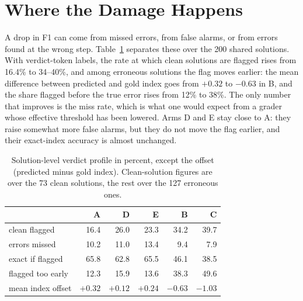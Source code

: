 \documentclass[11pt]{article}
\newcommand{\arm}[1]{\textsc{#1}}
\begin{document}
\section{Where the Damage Happens}
\label{sec:analysis}

A drop in F1 can come from missed errors, from false alarms, or from errors found at the wrong
step. Table~\ref{tab:profile} separates these over the 200 shared solutions. With verdict-token
labels, the rate at which clean solutions are flagged rises from 16.4\% to 34--40\%, and among
erroneous solutions the flag moves earlier: the mean difference between predicted and gold index
goes from $+0.32$ to $-0.63$ in \arm{B}, and the share flagged before the true error rises from
12\% to 38\%. The only number that improves is the miss rate, which is what one would expect
from a grader whose effective threshold has been lowered. Arms \arm{D} and \arm{E} stay close to
\arm{A}: they raise somewhat more false alarms, but they do not move the flag earlier, and their
exact-index accuracy is almost unchanged.

\begin{table}[t]
\centering
\small
\setlength{\tabcolsep}{2.6pt}
\begin{tabular}{lrrrrr}
\toprule
 & \arm{A} & \arm{D} & \arm{E} & \arm{B} & \arm{C} \\
\midrule
clean flagged & 16.4 & 26.0 & 23.3 & 34.2 & 39.7 \\
errors missed & 10.2 & 11.0 & 13.4 & 9.4 & 7.9 \\
exact if flagged & 65.8 & 62.8 & 65.5 & 46.1 & 38.5 \\
flagged too early & 12.3 & 15.9 & 13.6 & 38.3 & 49.6 \\
mean index offset & $+0.32$ & $+0.12$ & $+0.24$ & $-0.63$ & $-1.03$ \\
\bottomrule
\end{tabular}
\caption{Solution-level verdict profile in percent, except the offset (predicted minus gold
index). Clean-solution figures are over the 73 clean solutions, the rest over the 127 erroneous
ones.}
\label{tab:profile}
\end{table}
\end{document}
